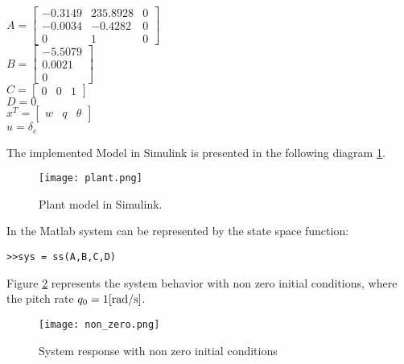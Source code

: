 $A = \begin{bmatrix} -0.3149 & 235.8928 & 0 \\
                     -0.0034 & -0.4282  & 0 \\
                      0      & 1        & 0 \end{bmatrix}$ \\


$B = \begin{bmatrix} -5.5079   \\
                      0.0021   \\
                      0        \end{bmatrix}$ \\


$C = \begin{bmatrix}  0 & 0 & 1 \end{bmatrix}$ \\


$D = 0$ \\

$x^T = \begin{bmatrix} w & q & \theta \end{bmatrix}$ \\

$u = \delta_e$

The implemented Model in Simulink is presented in the following 
diagram \ref{fig:plant}.

\begin{figure}[h]
    \centering
    \texttt{[image: plant.png]}
    \caption{Plant model in Simulink.}
    \label{fig:plant}
\end{figure}

In the Matlab system can be represented by the state space function:
\begin{lstlisting}[frame=single]
>>sys = ss(A,B,C,D)
\end{lstlisting}

Figure \ref{fig:non_zero} represents the system behavior with non zero initial
conditions, where the pitch rate $q_0 = 1 \rm [rad/s]$.

\begin{figure}[h!]
    \centering
    \texttt{[image: non\_zero.png]}
    \caption{System response with non zero initial conditions}
    \label{fig:non_zero}
\end{figure}




